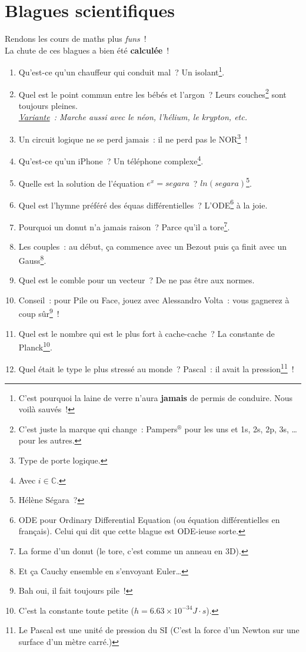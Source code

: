 \documentclass[10pt,a5paper,fullpage]{book}
\begin{document}
	\chapter{Blagues scientifiques}
	Rendons les cours de maths plus \textit{funs}~! \\La chute de ces blagues a bien été \textbf{calculée}~!  
	\newpage
	\begin{enumerate}
		\item Qu’est-ce qu’un chauffeur qui conduit mal~? Un isolant\footnote{C’est pourquoi la laine de verre n’aura \textbf{jamais} de permis de conduire. Nous voilà sauvés~!}.
		\item Quel est le point commun entre les bébés et l’argon~? Leurs couches\footnote{C'est juste la marque qui change~: Pampers$ ^{\circledR}$ pour les uns et 1s, 2s, 2p, 3s, \ldots pour les autres.} sont toujours pleines.	
		\\\textit{\underline{Variante}~: Marche aussi avec le néon, l’hélium, le krypton, etc.}
		\item Un circuit logique ne se perd jamais~: il ne perd pas le NOR\footnote{Type de porte logique.}~!
		\item Qu’est-ce qu’un iPhone~? Un téléphone complexe\footnote{Avec $i \in \mathbb{C}$.}.
		\item Quelle est la solution de l’équation $e^x = segara$~? $ln(segara)$\footnote{Hélène Ségara~?}.
		\item Quel est l’hymne préféré des équas différentielles~? L’ODE\footnote{ODE pour Ordinary Differential Equation (ou équation différentielles en français). Celui qui dit que cette blague est ODE-ieuse sorte.} à la joie.
		\item Pourquoi un donut n’a jamais raison~? Parce qu’il a tore\footnote{La forme d’un donut (le tore, c’est comme un anneau en 3D).}.
		\item Les couples~: au début, ça commence avec un Bezout puis ça finit avec un Gauss\footnote{Et ça Cauchy ensemble en s’envoyant Euler\ldots}.
		\item Quel est le comble pour un vecteur~? De ne pas être aux normes. 
		\item Conseil~: pour Pile ou Face, jouez avec Alessandro Volta~: vous gagnerez à coup sûr\footnote{Bah oui, il fait toujours pile~!}~!
		\item Quel est le nombre qui est le plus fort à cache-cache~? La constante de Planck\footnote{C'est la constante toute petite ($h = 6.63 \times 10^{-34} J\cdot s$).}.
		\item Quel était le type le plus stressé au monde~? Pascal~: il avait la pression\footnote{Le Pascal est une unité de pression du SI (C'est la force d'un Newton sur une surface d'un mètre carré.)}~!

\end{enumerate}
\end{document}
